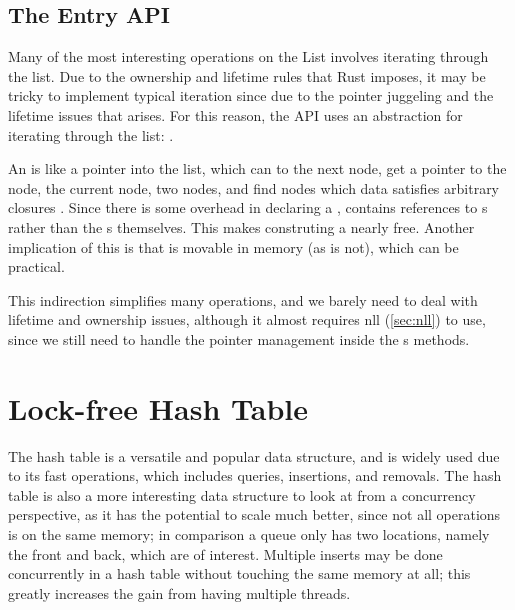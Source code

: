 \subsection{The Entry API}

Many of the most interesting operations on the List involves iterating through the list. Due to the
ownership and lifetime rules that Rust imposes, it may be tricky to implement typical iteration
since due to the pointer juggeling and the lifetime issues that arises. For this reason, the API
uses an abstraction for iterating through the list: .

\begin{figure}[ht]

\end{figure}

An  is like a pointer into the list, which can  to the next node, get a
pointer to the  node,  the current node,  two
nodes, and find nodes which data satisfies arbitrary closures .  Since there is
some overhead in declaring a ,  contains references to s rather
than the s themselves. This makes construting a  nearly free.  Another
implication of this is that  is movable in memory (as  is not), which can
be practical.

This indirection simplifies many operations, and we barely need to deal with lifetime and ownership
issues, although it almost requires \gls{nll} (\cref{sec:nll}) to use, since we still need to
handle the pointer management inside the s methods.

\begin{figure}[ht]

\end{figure}







\section{Lock-free Hash Table\label{sec:usage-hashmap}}

The hash table is a versatile and popular data structure, and is widely used due to its fast
operations, which includes queries, insertions, and removals. The hash table is also a more
interesting data structure to look at from a concurrency perspective, as it has the potential to
scale much better, since not all operations is on the same memory; in comparison a queue only has
two locations, namely the front and back, which are of interest. Multiple inserts may be done
concurrently in a hash table without touching the same memory at all; this greatly increases the
gain from having multiple threads.

